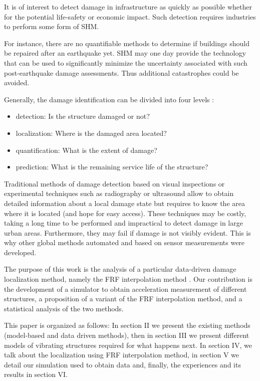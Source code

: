 \documentclass[journal]{IEEEtran}
\begin{document}
It is of interest to detect damage in infrastructure as quickly as possible whether
 for the potential life-safety or economic impact.
Such detection requires industries to perform some form of SHM.

For instance, there are  no quantifiable methods to
 determine if buildings should be repaired after an earthquake yet.
SHM may one day provide the technology that can be used to significantly minimize
 the uncertainty associated with such post-earthquake damage assessments.
Thus additional catastrophes could be avoided.


Generally, the damage identification can be divided into four levels \cite{peeters2000system}:
\begin{itemize}
\item detection: Is the structure damaged or not?
\item localization: Where is the damaged area located?
\item quantification: What is the extent of damage?
\item prediction: What is the remaining service life of the structure?
\end{itemize}
\vspace{2mm}

Traditional methods of damage detection based on visual inspections or experimental techniques such as radiography
 or ultrasound allow to obtain detailed information about a local damage state but requires to know the area where it is located (and hope for easy access).
These techniques may be costly, taking a long time to be performed and impractical to detect damage in large urban areas.
 Furthermore, they may fail if damage is not visibly evident. This is why other global methods automated
 and based on sensor measurements were developed.



The purpose of this work is the analysis of a particular data-driven damage localization method,
 namely the FRF interpolation method \cite{dilena2015damage}. Our contribution is the development of a simulator to obtain acceleration measurement of different structures, a proposition of a variant of the FRF interpolation method, and a statistical analysis of the two methods.

This paper is organized as follows: In section II we  present the existing methods (model-based and data driven methods),
then in section III we present different models of vibrating structures required for what happens next. In section IV,  we talk about the localization using FRF interpolation method, in section V we detail our simulation used to obtain data and, finally, the experiences and its results in section VI.
\end{document}
